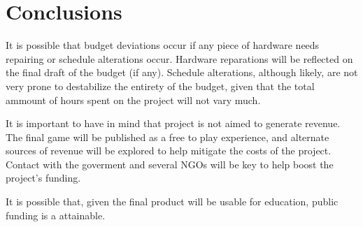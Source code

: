 \section{Conclusions}

It is possible that budget deviations occur if any piece of hardware needs repairing or schedule alterations occur. Hardware reparations will be reflected on the final draft of the budget (if any). Schedule alterations, although likely, are not very prone to destabilize the entirety of the budget, given that the total ammount of hours spent on the project will not vary much.  

It is important to have in mind that project is not aimed to generate revenue. The final game will be published as a free to play experience, and alternate sources of revenue will be explored to help mitigate the costs of the project. Contact with the goverment and several \glspl{NGO} will be key to help boost the project's funding.

It is possible that, given the final product will be usable for education, public funding is a attainable.
